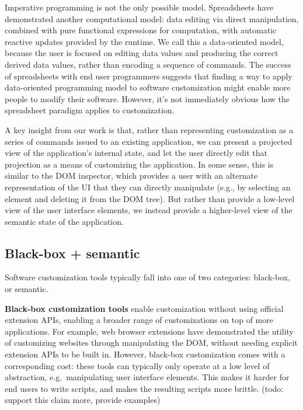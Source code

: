 \documentclass[sigplan,10pt,anonymous,review]{acmart}
\begin{document}
Imperative programming is not the only possible model. Spreadsheets have
demonstrated another computational model: data editing via direct
manipulation, combined with pure functional expressions for computation,
with automatic reactive updates provided by the runtime. We call this a
data-oriented model, because the user is focused on editing data values
and producing the correct derived data values, rather than encoding a
sequence of commands. The success of spreadsheets with end user
programmers suggests that finding a way to apply data-oriented
programming model to software customization might enable more people to
modify their software. However, it's not immediately obvious how the
spreadsheet paradigm applies to customization.

A key insight from our work is that, rather than representing
customization as a series of commands issued to an existing application,
we can present a projected view of the application's internal state, and
let the user directly edit that projection as a means of customizing the
application. In some sense, this is similar to the DOM inspector, which
provides a user with an alternate representation of the UI that they can
directly manipulate (e.g., by selecting an element and deleting it from
the DOM tree). But rather than provide a low-level view of the user
interface elements, we instead provide a higher-level view of the
semantic state of the application.

\hypertarget{black-box-semantic}{%
\subsection{Black-box + semantic}\label{black-box-semantic}}

Software customization tools typically fall into one of two categories:
black-box, or semantic.

\textbf{Black-box customization tools} enable customization without
using official extension APIs, enabling a broader range of
customizations on top of more applications. For example, web browser
extensions have demonstrated the utility of customizing websites through
manipulating the DOM, without needing explicit extension APIs to be
built in. However, black-box customization comes with a corresponding
cost: these tools can typically only operate at a low level of
abstraction, e.g.~manipulating user interface elements. This makes it
harder for end users to write scripts, and makes the resulting scripts
more brittle. (todo: support this claim more, provide examples)
\end{document}

